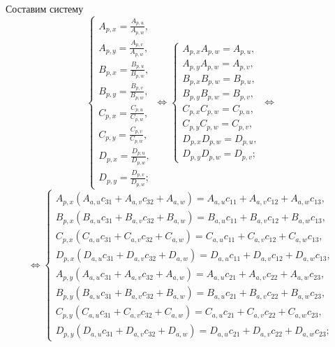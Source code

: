 Составим систему
\begin{equation*}
	\begin{cases}
		A_{p,x} = \frac{A_{p,u}}{A_{p,w}},\\
		A_{p,y} = \frac{A_{p,v}}{A_{p,w}},\\
		B_{p,x} = \frac{B_{p,u}}{B_{p,w}},\\
		B_{p,y} = \frac{B_{p,v}}{B_{p,w}},\\
		C_{p,x} = \frac{C_{p,u}}{C_{p,w}},\\
		C_{p,y} = \frac{C_{p,v}}{C_{p,w}},\\
		D_{p,x} = \frac{D_{p,u}}{D_{p,w}},\\
		D_{p,y} = \frac{D_{p,v}}{D_{p,w}};
	\end{cases}
	\Leftrightarrow
	\begin{cases}
		A_{p,x} A_{p,w} = A_{p,u},\\
		A_{p,y} A_{p,w} = A_{p,v},\\
		B_{p,x} B_{p,w} = B_{p,u},\\
		B_{p,y} B_{p,w} = B_{p,v},\\
		C_{p,x} C_{p,w} = C_{p,u},\\
		C_{p,y} C_{p,w} = C_{p,v},\\
		D_{p,x} D_{p,w} = D_{p,u},\\
		D_{p,y} D_{p,w} = D_{p,v};
	\end{cases}
	\Leftrightarrow
\end{equation*}
\begin{equation*}
	\Leftrightarrow
	\begin{cases}
		A_{p,x}\left( A_{a,u} c_{31} + A_{a,v} c_{32} + A_{a,w} \right) = A_{a,u} c_{11} + A_{a,v} c_{12} + A_{a,w} c_{13},\\
		B_{p,x}\left( B_{a,u} c_{31} + B_{a,v} c_{32} + B_{a,w} \right) = B_{a,u} c_{11} + B_{a,v} c_{12} + B_{a,w} c_{13},\\
		C_{p,x}\left( C_{a,u} c_{31} + C_{a,v} c_{32} + C_{a,w} \right) = C_{a,u} c_{11} + C_{a,v} c_{12} + C_{a,w} c_{13},\\
		D_{p,x}\left( D_{a,u} c_{31} + D_{a,v} c_{32} + D_{a,w} \right) = D_{a,u} c_{11} + D_{a,v} c_{12} + D_{a,w} c_{13},\\
		A_{p,y}\left( A_{a,u} c_{31} + A_{a,v} c_{32} + A_{a,w} \right) = A_{a,u} c_{21} + A_{a,v} c_{22} + A_{a,w} c_{23},\\
		B_{p,y}\left( B_{a,u} c_{31} + B_{a,v} c_{32} + B_{a,w} \right) = B_{a,u} c_{21} + B_{a,v} c_{22} + B_{a,w} c_{23},\\
		C_{p,y}\left( C_{a,u} c_{31} + C_{a,v} c_{32} + C_{a,w} \right) = C_{a,u} c_{21} + C_{a,v} c_{22} + C_{a,w} c_{23},\\
		D_{p,y}\left( D_{a,u} c_{31} + D_{a,v} c_{32} + D_{a,w} \right) = D_{a,u} c_{21} + D_{a,v} c_{22} + D_{a,w} c_{23};
	\end{cases}
\end{equation*}

